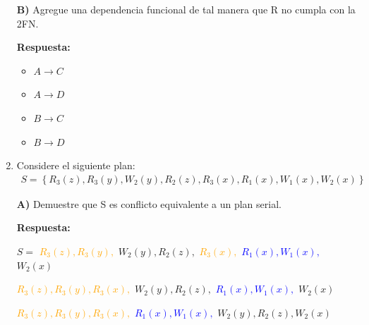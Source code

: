 \documentclass{templateNote}
\begin{document}
\begin{enumerate}
    \newpage
    \textbf{B)} Agregue una dependencia funcional de tal manera que R no cumpla con la 2FN.

    \textbf{Respuesta:}

    \begin{itemize}
        \item $A \rightarrow C$
        \item $A \rightarrow D$
        \item $B \rightarrow C$
        \item $B \rightarrow D$
    \end{itemize}
    
    \hrulefill

    \item Considere el siguiente plan:
    \begin{align*}
        S = \left\{R_3(z), R_3(y), W_2(y), R_2(z), R_3(x), R_1(x), W_1(x), W_2(x)\right\}
    \end{align*}

    \hrulefill

    \textbf{A)} Demuestre que S es conflicto equivalente a un plan serial.
    
    \textbf{Respuesta:}

    $S = $ \textcolor{orange}{$R_3(z), R_3(y),$} \textcolor{green!80!black}{$W_2(y), R_2(z),$} \textcolor{orange}{$R_3(x),$} \textcolor{blue}{$R_1(x), W_1(x),$} \textcolor{green!80!black}{$W_2(x)$}
    
    \qquad \textcolor{orange}{$R_3(z), R_3(y), R_3(x),$} \textcolor{green!80!black}{$W_2(y), R_2(z),$} \textcolor{blue}{$R_1(x), W_1(x),$} \textcolor{green!80!black}{$W_2(x)$}
    
    \qquad \textcolor{orange}{$R_3(z), R_3(y), R_3(x),$} \textcolor{blue}{$R_1(x), W_1(x),$} \textcolor{green!80!black}{$W_2(y), R_2(z), W_2(x)$}

    \begin{figure}[H]
        \begin{center}
            

\end{center}
\end{figure}
\end{enumerate}
\end{document}

